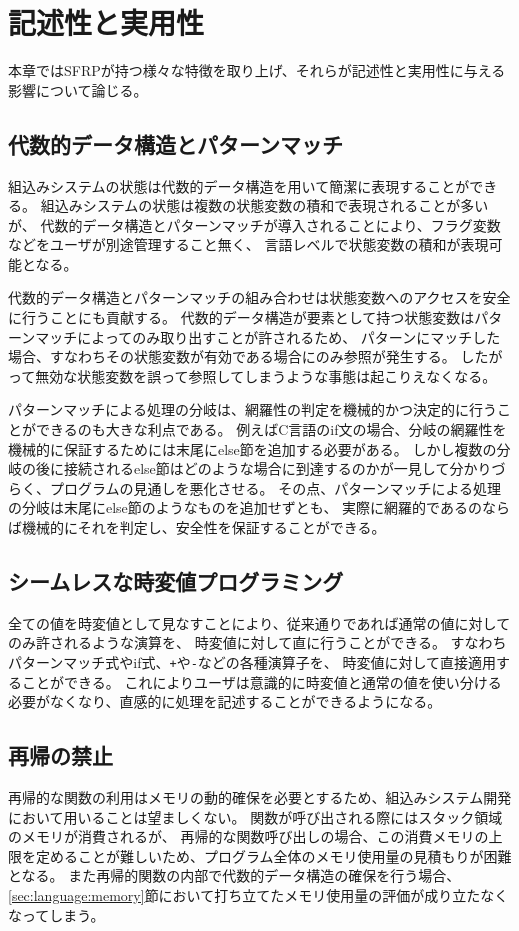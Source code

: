 \chapter{記述性と実用性}
本章ではSFRPが持つ様々な特徴を取り上げ、それらが記述性と実用性に与える影響について論じる。

\section{代数的データ構造とパターンマッチ}
組込みシステムの状態は代数的データ構造を用いて簡潔に表現することができる。
組込みシステムの状態は複数の状態変数の積和で表現されることが多いが、
代数的データ構造とパターンマッチが導入されることにより、フラグ変数などをユーザが別途管理すること無く、
言語レベルで状態変数の積和が表現可能となる。

代数的データ構造とパターンマッチの組み合わせは状態変数へのアクセスを安全に行うことにも貢献する。
代数的データ構造が要素として持つ状態変数はパターンマッチによってのみ取り出すことが許されるため、
パターンにマッチした場合、すなわちその状態変数が有効である場合にのみ参照が発生する。
したがって無効な状態変数を誤って参照してしまうような事態は起こりえなくなる。

パターンマッチによる処理の分岐は、網羅性の判定を機械的かつ決定的に行うことができるのも大きな利点である。
例えばC言語のif文の場合、分岐の網羅性を機械的に保証するためには末尾にelse節を追加する必要がある。
しかし複数の分岐の後に接続されるelse節はどのような場合に到達するのかが一見して分かりづらく、プログラムの見通しを悪化させる。
その点、パターンマッチによる処理の分岐は末尾にelse節のようなものを追加せずとも、
実際に網羅的であるのならば機械的にそれを判定し、安全性を保証することができる。

\section{シームレスな時変値プログラミング}
全ての値を時変値として見なすことにより、従来通りであれば通常の値に対してのみ許されるような演算を、
時変値に対して直に行うことができる。
すなわちパターンマッチ式やif式、\texttt{+}や\texttt{-}などの各種演算子を、
時変値に対して直接適用することができる。
これによりユーザは意識的に時変値と通常の値を使い分ける必要がなくなり、直感的に処理を記述することができるようになる。

\section{再帰の禁止}
再帰的な関数の利用はメモリの動的確保を必要とするため、組込みシステム開発において用いることは望ましくない。
関数が呼び出される際にはスタック領域のメモリが消費されるが、
再帰的な関数呼び出しの場合、この消費メモリの上限を定めることが難しいため、プログラム全体のメモリ使用量の見積もりが困難となる。
また再帰的関数の内部で代数的データ構造の確保を行う場合、
\ref{sec:language:memory}節において打ち立てたメモリ使用量の評価が成り立たなくなってしまう。

